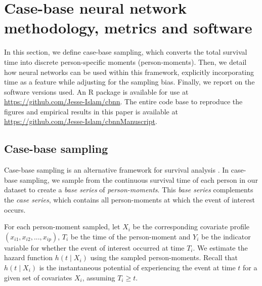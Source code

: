 \documentclass[AMA,STIX1COL,]{WileyNJD-v2}
\begin{document}
\hypertarget{methods}{%
\section{Case-base neural network methodology, metrics and
software}\label{methods}}

In this section, we define case-base sampling, which converts the total
survival time into discrete person-specific moments (person-moments).
Then, we detail how neural networks can be used within this framework,
explicitly incorporating time as a feature while adjusting for the
sampling bias. Finally, we report on the software versions used. An R
package is available for use at
\url{https://github.com/Jesse-Islam/cbnn}. The entire code base to
reproduce the figures and empirical results in this paper is available
at \url{https://github.com/Jesse-Islam/cbnnManuscript}.

\hypertarget{case-base-sampling}{%
\subsection{Case-base sampling}\label{case-base-sampling}}

Case-base sampling is an alternative framework for survival analysis
\citep{hanley2009}. In case-base sampling, we sample from the continuous
survival time of each person in our dataset to create a \emph{base
series} of \emph{person-moments}. This \emph{base series} complements
the \emph{case series}, which contains all person-moments at which the
event of interest occurs.

For each person-moment sampled, let \(X_i\) be the corresponding
covariate profile \(\left(x_{i1},x_{i2},...,x_{ip} \right)\), \(T_i\) be
the time of the person-moment and \(Y_i\) be the indicator variable for
whether the event of interest occurred at time \(T_i\). We estimate the
hazard function \(h(t \mid X_i)\) using the sampled person-moments.
Recall that \(h(t \mid X_i)\) is the instantaneous potential of
experiencing the event at time \(t\) for a given set of covariates
\(X_i\), assuming \(T_i \geq t\).
\end{document}
